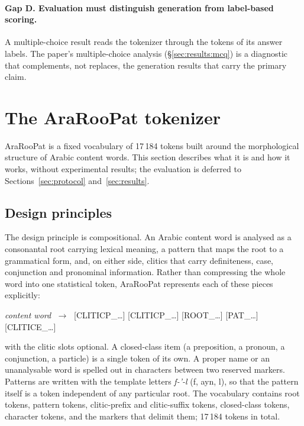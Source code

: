 \documentclass[a4paper,fleqn]{cas-sc}
\begin{document}
\paragraph{Gap D. Evaluation must distinguish generation from label-based scoring.} A multiple-choice result reads the tokenizer through the tokens of its answer labels. The paper's multiple-choice analysis (\S\ref{sec:results:mcq}) is a diagnostic that complements, not replaces, the generation results that carry the primary claim.

\section{The AraRooPat tokenizer}
\label{sec:tokenizer}

AraRooPat is a fixed vocabulary of 17\,184 tokens built around the morphological structure of Arabic content words. This section describes what it is and how it works, without experimental results; the evaluation is deferred to Sections~\ref{sec:protocol} and~\ref{sec:results}.

\subsection{Design principles}
\label{sec:tokenizer:design}

The design principle is compositional. An Arabic content word is analysed as a consonantal root carrying lexical meaning, a pattern that maps the root to a grammatical form, and, on either side, clitics that carry definiteness, case, conjunction and pronominal information. Rather than compressing the whole word into one statistical token, AraRooPat represents each of these pieces explicitly:

\begin{center}
\emph{content word} $\;\to\;$ [CLITICP\_\dots] [CLITICP\_\dots] [ROOT\_\dots] [PAT\_\dots] [CLITICE\_\dots]
\end{center}

with the clitic slots optional. A closed-class item (a preposition, a pronoun, a conjunction, a particle) is a single token of its own. A proper name or an unanalysable word is spelled out in characters between two reserved markers. Patterns are written with the template letters \emph{f-'-l} (f, ayn, l), so that the pattern itself is a token independent of any particular root. The vocabulary contains root tokens, pattern tokens, clitic-prefix and clitic-suffix tokens, closed-class tokens, character tokens, and the markers that delimit them; 17\,184 tokens in total.
\end{document}
